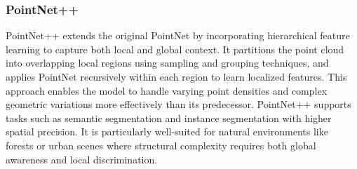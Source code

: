 \documentclass[../report.tex]{subfiles}
\begin{document}
    \subsubsection{\textbf{PointNet++}}
    
    PointNet++\cite{PointNet++} extends the original PointNet by incorporating hierarchical feature learning to capture both local and global context. It partitions the point cloud into overlapping local regions using sampling and grouping techniques, and applies PointNet recursively within each region to learn localized features. This approach enables the model to handle varying point densities and complex geometric variations more effectively than its predecessor. PointNet++ supports tasks such as semantic segmentation and instance segmentation with higher spatial precision. It is particularly well-suited for natural environments like forests or urban scenes where structural complexity requires both global awareness and local discrimination.
    
\end{document}
